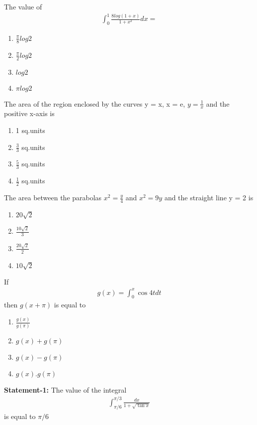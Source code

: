 \item The value of
\begin{align*}
\int_{0}^{1}\frac{8log(1 + x)}{1 + x^2}dx = 
\end{align*}
\begin{enumerate}
\item $\frac{\pi}{8}log2$
\item $\frac{\pi}{2}log2$
\item $log2$
\item $\pi log2$
\end{enumerate}

\item The area of the region enclosed by the curves y = x, x = e, $y = \frac{1}{x}$ and the positive x-axis is
\begin{enumerate}
\item 1 sq.units
\item $\frac{3}{3}$ sq.units
\item $\frac{5}{3}$ sq.units
\item $\frac{1}{2}$ sq.units
\end{enumerate}

\item The area between the parabolas $x^2 = \frac{y}{4}$ and $x^2 = 9y$ and the straight line y = 2 is
\begin{enumerate}
\item $20\sqrt{2}$
\item $\frac{10\sqrt{2}}{3}$
\item $\frac{20\sqrt{2}}{2}$
\item $10\sqrt{2}$
\end{enumerate}

\item If 
\begin{align*}
g(x)  = \int_{0}^{x}\cos 4t dt
\end{align*}
then $g(x + \pi)$ is equal to
\begin{enumerate}
\item $\frac{g(x)}{g(\pi)}$
\item $g(x) + g(\pi)$
\item $g(x) - g(\pi)$
\item $g(x).g(\pi)$
\end{enumerate}

\item 
\textbf{Statement-1:} The value of the integral
\begin{align*}
\int_{\pi/6}^{\pi/3}\frac{dx}{1 + \sqrt{\tan x}}
\end{align*}
is equal to $\pi/6$

